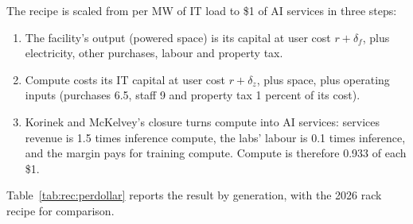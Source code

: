 The recipe is scaled from per MW of IT load to \$1 of AI services in three steps:
\begin{enumerate}
  \item The facility's output (powered space) is its capital at user cost $r+\delta_f$, plus
    electricity, other purchases, labour and property tax.
  \item Compute costs its IT capital at user cost $r+\delta_z$, plus space, plus operating inputs
    (purchases 6.5, staff 9 and property tax 1 percent of its cost).
  \item Korinek and McKelvey's closure turns compute into AI services: services revenue is 1.5
    times inference compute, the labs' labour is 0.1 times inference, and the margin pays for
    training compute. Compute is therefore 0.933 of each \$1.
\end{enumerate}
Table~\ref{tab:rec:perdollar} reports the result by generation, with the 2026 rack recipe for
comparison.


